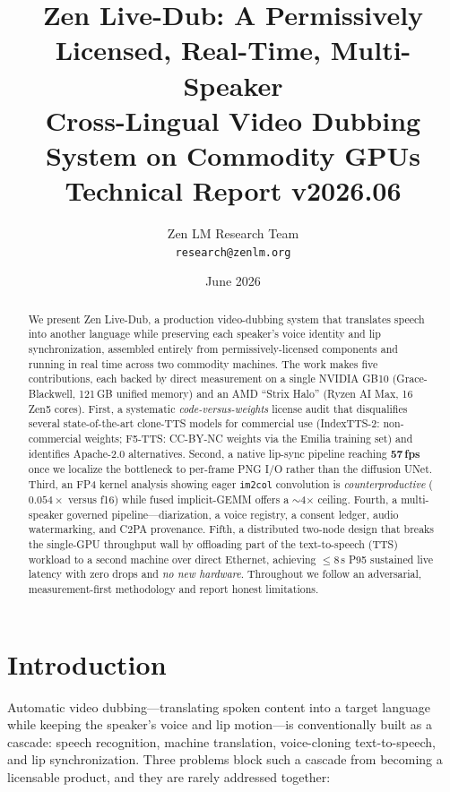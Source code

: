 \documentclass[11pt,a4paper]{article}
\title{\textbf{Zen Live-Dub: A Permissively Licensed, Real-Time, Multi-Speaker\\ Cross-Lingual Video Dubbing System on Commodity GPUs}\\
\large Technical Report v2026.06}
\author{Zen LM Research Team\\
\texttt{research@zenlm.org}}
\date{June 2026}
\begin{document}
\maketitle

\begin{abstract}
We present Zen Live-Dub, a production video-dubbing system that translates speech into another language while preserving each speaker's voice identity and lip synchronization, assembled entirely from permissively-licensed components and running in real time across two commodity machines. The work makes five contributions, each backed by direct measurement on a single NVIDIA GB10 (Grace-Blackwell, 121\,GB unified memory) and an AMD ``Strix Halo'' (Ryzen AI Max, 16 Zen5 cores). First, a systematic \emph{code-versus-weights} license audit that disqualifies several state-of-the-art clone-TTS models for commercial use (IndexTTS-2: non-commercial weights; F5-TTS: CC-BY-NC weights via the Emilia training set) and identifies Apache-2.0 alternatives. Second, a native lip-sync pipeline reaching \textbf{57\,fps} once we localize the bottleneck to per-frame PNG I/O rather than the diffusion UNet. Third, an FP4 kernel analysis showing eager \texttt{im2col} convolution is \emph{counterproductive} ($0.054\times$ versus f16) while fused implicit-GEMM offers a $\sim$4$\times$ ceiling. Fourth, a multi-speaker governed pipeline---diarization, a voice registry, a consent ledger, audio watermarking, and C2PA provenance. Fifth, a distributed two-node design that breaks the single-GPU throughput wall by offloading part of the text-to-speech (TTS) workload to a second machine over direct Ethernet, achieving $\leq$8\,s P95 sustained live latency with zero drops and \emph{no new hardware}. Throughout we follow an adversarial, measurement-first methodology and report honest limitations.
\end{abstract}

\section{Introduction}

Automatic video dubbing---translating spoken content into a target language while keeping the speaker's voice and lip motion---is conventionally built as a cascade: speech recognition, machine translation, voice-cloning text-to-speech, and lip synchronization. Three problems block such a cascade from becoming a licensable product, and they are rarely addressed together:
\end{document}
